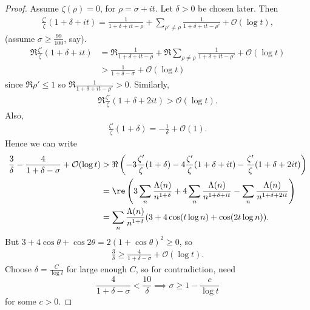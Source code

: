 \documentclass{article}
\newcommand{\1}{\mathbbm{1}}
\newcommand{\bigO}{\mathcal{O}}
\begin{document}
\begin{proof}
  Assume $\zeta(\rho) = 0$, for $\rho = \sigma + it$. Let $\delta > 0$ be chosen later.
  Then
  \begin{align*}
    \frac{\zeta'}{\zeta}(1 + \delta + it) = \frac{1}{1+\delta+it-\rho} + \sum_{\rho' \neq \rho} \frac{1}{1+\delta+it-\rho'} + \bigO(\log t),
  \end{align*}
  (assume $\sigma \geq \frac{99}{100}$, say).
  \begin{align*}
    \Re \frac{\zeta'}{\zeta}(1+\delta+it) &= \Re \frac{1}{1+\delta+it-\rho} + \Re \sum_{\rho\neq\rho} \frac{1}{1+\delta+it-\rho'} + \bigO(\log t) \\
                                          &> \frac{1}{1+\delta-\sigma} + \bigO(\log t)
  \end{align*}
  since $\Re \rho' \leq 1$ so $\Re \frac{1}{1+\delta+it-\rho'} >0$.
  Similarly,
  \begin{align*}
    \Re \frac{\zeta'}{\zeta} (1+\delta+2it) > \bigO(\log t).
  \end{align*}
  Also,
  \begin{align*}
    \frac{\zeta'}{\zeta}(1+\delta) = - \frac{1}{\delta} + \bigO(1).
  \end{align*}
  Hence we can write
  \begin{align*}
    \frac{3}{\delta} - \frac{4}{1+\delta-\sigma} + \bigO(\log t) &> \Re \left(-3 \frac{\zeta'}{\zeta}(1 + \delta) - 4 \frac{\zeta'}{\zeta}(1 + \delta + it) - \frac{\zeta'}{\zeta} (1 + \delta + 2it)\right) \\
                                                                 &= \re \left(3 \sum_n \frac{\Lambda(n)}{n^{1+\delta}} + 4 \sum_n \frac{\Lambda(n)}{n^{1+\delta+it}} - \sum_n \frac{\Lambda(n)}{n^{1+\delta+2it}}\right) \\
                                                                 &= \sum_n \frac{\Lambda(n)}{n^{1+\delta}} (3 + 4 \cos(t \log n) + \cos(2t \log n)).
  \end{align*}
  But $3 + 4 \cos \theta + \cos 2\theta = 2(1 + \cos \theta)^2 \geq 0$, so
  \begin{align*}
    \frac{3}{\delta} \geq \frac{4}{1+\delta-\sigma} + \bigO(\log t).
  \end{align*}
  Choose $\delta = \frac{C}{\log t}$ for large enough $C$, so for contradiction, need
  \begin{equation*}\frac{4}{1+\delta-\sigma} < \frac{10}{\delta}\implies\sigma\geq 1-\frac{c}{\log t}\end{equation*}
  for some $c > 0$.
\end{proof}
\end{document}
